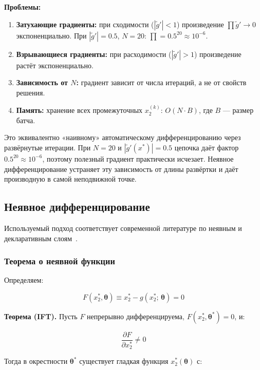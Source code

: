 \documentclass[11pt]{article}
\begin{document}
\textbf{Проблемы:}
\begin{enumerate}
  \item \textbf{Затухающие градиенты:} при сходимости ($|\tilde{g}'| < 1$) произведение $\prod \tilde{g}' \to 0$ экспоненциально. При $|\tilde{g}'| = 0.5$, $N = 20$: $\prod = 0.5^{20} \approx 10^{-6}$.
  \item \textbf{Взрывающиеся градиенты:} при расходимости ($|\tilde{g}'| > 1$) произведение растёт экспоненциально.
  \item \textbf{Зависимость от $N$:} градиент зависит от числа итераций, а не от свойств решения.
  \item \textbf{Память:} хранение всех промежуточных $x_2^{(k)}$: $O(N \cdot B)$, где $B$ --- размер батча.
\end{enumerate}

Это эквивалентно «наивному» автоматическому дифференцированию через развёрнутые итерации. При $N=20$ и $|\tilde{g}'(x^*)|=0.5$ цепочка даёт фактор $0.5^{20}\approx10^{-6}$, поэтому полезный градиент практически исчезает. Неявное дифференцирование устраняет эту зависимость от длины развёртки и даёт производную в самой неподвижной точке.

\subsection{Неявное дифференцирование}

Используемый подход соответствует современной литературе по неявным и декларативным слоям~\cite{bai2019,gould2021,amos2017}.

\subsubsection{Теорема о неявной функции}

Определяем:

\begin{equation*}
F(x_2^{*}, \boldsymbol{\theta}) \equiv x_2^{*} - g(x_2^{*};\, \boldsymbol{\theta}) = 0
\end{equation*}

\textbf{Теорема (IFT).} Пусть $F$ непрерывно дифференцируема, $F(x_2^{*}, \boldsymbol{\theta}^{*}) = 0$, и:

\begin{equation*}
\frac{\partial F}{\partial x_2^{*}} \neq 0
\end{equation*}

Тогда в окрестности $\boldsymbol{\theta}^{*}$ существует гладкая функция $x_2^{*}(\boldsymbol{\theta})$ с:
\end{document}
